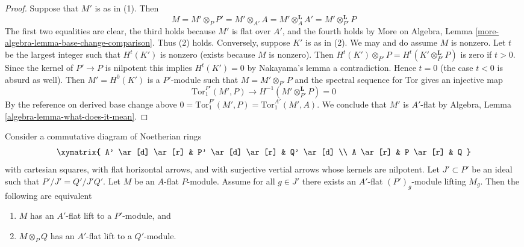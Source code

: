 \begin{proof}
Suppose that $M'$ is as in (1). Then
$$
M = M' \otimes_P P' = M' \otimes_{A'} A =
M' \otimes_A^\mathbf{L} A' = M' \otimes_{P'}^\mathbf{L} P
$$
The first two equalities are clear, the third holds because
$M'$ is flat over $A'$, and the fourth holds by
More on Algebra, Lemma \ref{more-algebra-lemma-base-change-comparison}.
Thus (2) holds. Conversely, suppose $K'$ is as in (2).
We may and do assume $M$ is nonzero.
Let $t$ be the largest integer such that $H^t(K')$ is nonzero
(exists because $M$ is nonzero).
Then $H^t(K') \otimes_{P'} P = H^t(K' \otimes_{P'}^\mathbf{L} P)$
is zero if $t > 0$. Since the kernel of $P' \to P$ is nilpotent
this implies $H^t(K') = 0$ by Nakayama's lemma a contradiction.
Hence $t = 0$ (the case $t < 0$ is absurd as well).
Then $M' = H^0(K')$ is a $P'$-module such that $M = M' \otimes_{P'} P$
and the spectral sequence for Tor gives an injective map
$$
\text{Tor}_1^{P'}(M', P) \to H^{-1}(M' \otimes_{P'}^\mathbf{L} P) = 0
$$
By the reference on derived base change above
$0 = \text{Tor}_1^{P'}(M', P) = \text{Tor}_1^{A'}(M', A)$.
We conclude that $M'$ is $A'$-flat by
Algebra, Lemma \ref{algebra-lemma-what-does-it-mean}.
\end{proof}

\begin{lemma}
\label{lemma-lift-equivalence-module}
Consider a commutative diagram of Noetherian rings
$$
\xymatrix{
A' \ar[d] \ar[r] &
P' \ar[d] \ar[r] &
Q' \ar[d] \\
A \ar[r] &
P \ar[r] &
Q
}
$$
with cartesian squares, with flat horizontal arrows, and with
surjective vertial arrows whose kernels are nilpotent.
Let $J' \subset P'$ be an ideal such that $P'/J' = Q'/J'Q'$.
Let $M$ be an $A$-flat $P$-module.
Assume for all $g \in J'$ there exists an $A'$-flat $(P')_g$-module
lifting $M_g$. Then the following are equivalent
\begin{enumerate}
\item $M$ has an $A'$-flat lift to a $P'$-module, and
\item $M \otimes_P Q$ has an $A'$-flat lift to a $Q'$-module.
\end{enumerate}
\end{lemma}

